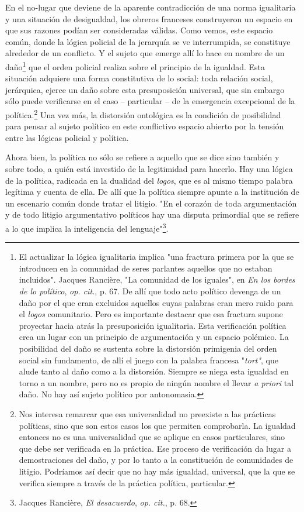 \documentclass{book}
\begin{document}
En el no-lugar que deviene de la aparente contradicción de una norma
igualitaria y una situación de desigualdad, los obreros franceses
construyeron un espacio en que sus razones podían ser consideradas
válidas. Como vemos, este espacio común, donde la lógica policial de la
jerarquía se ve interrumpida, se constituye alrededor de un conflicto. Y
el sujeto que emerge allí lo hace en nombre de un daño\footnote{El
  actualizar la lógica igualitaria implica "una fractura primera por la
  que se introducen en la comunidad de seres parlantes aquellos que no
  estaban incluidos". Jacques Rancière, "La comunidad de los iguales",
  en \emph{En los bordes de lo político}, \emph{op. cit.}, p. 67. De
  allí que todo acto político devenga de un daño por el que eran
  excluidos aquellos cuyas palabras eran mero ruido para el \emph{logos}
  comunitario. Pero es importante destacar que esa fractura supone
  proyectar hacia atrás la presuposición igualitaria. Esta verificación
  política crea un lugar con un principio de argumentación y un espacio
  polémico. La posibilidad del daño se sustenta sobre la distorsión
  primigenia del orden social sin fundamento, de allí el juego con la
  palabra francesa "\emph{tort"}, que alude tanto al daño como a la
  distorsión. Siempre se niega esta igualdad en torno a un nombre, pero
  no es propio de ningún nombre el llevar \emph{a priori} tal daño. No
  hay así sujeto político por antonomasia.} que el orden policial
realiza sobre el principio de la igualdad. Esta situación adquiere una
forma constitutiva de lo social: toda relación social, jerárquica,
ejerce un daño sobre esta presuposición universal, que sin embargo sólo
puede verificarse en el caso -- particular -- de la emergencia
excepcional de la política.\footnote{Nos interesa remarcar que esa
  universalidad no preexiste a las prácticas políticas, sino que son
  estos casos los que permiten comprobarla. La igualdad entonces no es
  una universalidad que se aplique en casos particulares, sino que debe
  ser verificada en la práctica. Ese proceso de verificación da lugar a
  demostraciones del daño, y por lo tanto a la constitución de
  comunidades de litigio. Podríamos así decir que no hay más igualdad,
  universal, que la que se verifica siempre a través de la práctica
  política, particular.} Una vez más, la distorsión ontológica es la
condición de posibilidad para pensar al sujeto político en este
conflictivo espacio abierto por la tensión entre las lógicas policial y
política.

Ahora bien, la política no sólo se refiere a aquello que se dice sino
también y sobre todo, a quién está investido de la legitimidad para
hacerlo. Hay una lógica de la política, radicada en la dualidad del
\emph{logos}, que es al mismo tiempo palabra legítima y cuenta de ella.
De allí que la política siempre apunte a la institución de un escenario
común donde tratar el litigio. "En el corazón de toda argumentación y de
todo litigio argumentativo políticos hay una disputa primordial que se
refiere a lo que implica la inteligencia del lenguaje"\footnote{Jacques
  Rancière, \emph{El desacuerdo}, \emph{op. cit.}, p. 68.}.
\end{document}
